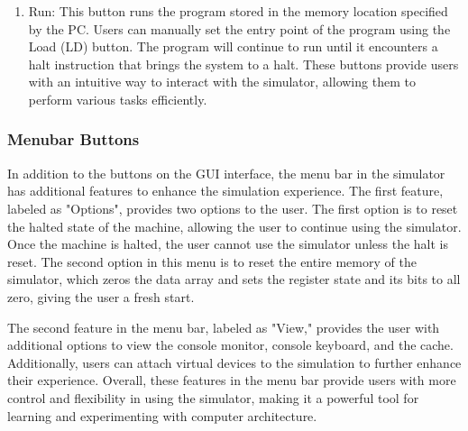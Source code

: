 \documentclass[10pt]{article}
\begin{document}
\begin{enumerate}
  \item Run: This button runs the program stored in the memory location specified by the PC. 
  Users can manually set the entry point of the program using the Load (LD) button. The program will continue 
  to run until it encounters a halt instruction that brings the system to a halt. These buttons provide 
  users with an intuitive way to interact with the simulator, allowing them to perform various tasks efficiently.
\end{enumerate}

\subsubsection{Menubar Buttons}
In addition to the buttons on the GUI interface, the menu bar in the simulator has additional features to 
enhance the simulation experience. The first feature, labeled as "Options", provides two options to the user. 
The first option is to reset the halted state of the machine, allowing the user to continue using the simulator. 
Once the machine is halted, the user cannot use the simulator unless the halt is reset. 
The second option in this menu is to reset the entire memory of the simulator, which zeros the data array 
and sets the register state and its bits to all zero, giving the user a fresh start.

The second feature in the menu bar, labeled as "View," provides the user with additional options to view the 
console monitor, console keyboard, and the cache. Additionally, users can attach virtual devices to the simulation 
to further enhance their experience. Overall, these features in the menu bar provide users with more control 
and flexibility in using the simulator, making it a powerful tool for learning and experimenting with computer 
architecture.
\end{document}
